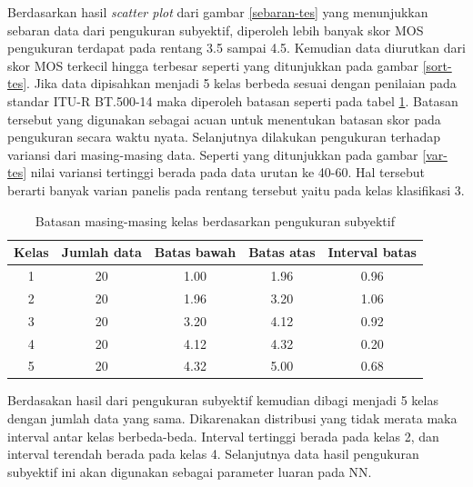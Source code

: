 Berdasarkan hasil \textit{scatter plot} dari gambar \ref{sebaran-tes} yang menunjukkan sebaran data dari pengukuran subyektif, diperoleh lebih banyak skor MOS pengukuran terdapat pada rentang 3.5 sampai 4.5. Kemudian data diurutkan dari skor MOS terkecil hingga terbesar seperti yang ditunjukkan pada gambar \ref{sort-tes}. Jika data dipisahkan menjadi 5 kelas berbeda sesuai dengan penilaian pada standar ITU-R BT.500-14 maka diperoleh batasan seperti pada tabel \ref{batas-kelas}. Batasan tersebut yang digunakan sebagai acuan untuk menentukan batasan skor pada pengukuran secara waktu nyata. Selanjutnya dilakukan pengukuran terhadap variansi dari masing-masing data. Seperti yang ditunjukkan pada gambar \ref{var-tes} nilai variansi tertinggi berada pada data urutan ke 40-60. Hal tersebut berarti banyak varian panelis pada rentang tersebut yaitu pada kelas klasifikasi 3.

\begin{table}[H]
	\fontsize{12pt}{12pt}\selectfont
	\centering
	\caption{Batasan masing-masing kelas berdasarkan pengukuran subyektif}
	\label{batas-kelas}
	\begin{tabular}{|c|c|c|c|c|}
		\hline
		\rowcolor[HTML]{EFEFEF} 
		Kelas & Jumlah data & Batas bawah & Batas atas & \multicolumn{1}{l|}{\cellcolor[HTML]{EFEFEF}Interval batas} \\ \hline
			1 & 20 & 1.00 & 1.96 & 0.96 \\ \hline
			2 & 20 & 1.96 & 3.20 & 1.06 \\ \hline
			3 & 20 & 3.20 & 4.12 & 0.92 \\ \hline
			4 & 20 & 4.12 & 4.32 & 0.20 \\ \hline
			5 & 20 & 4.32 & 5.00 & 0.68 \\ \hline
	\end{tabular}
\end{table}

Berdasakan hasil dari pengukuran subyektif kemudian dibagi menjadi 5 kelas dengan jumlah data yang sama. Dikarenakan distribusi yang tidak merata maka interval antar kelas berbeda-beda. Interval tertinggi berada pada kelas 2, dan interval terendah berada pada kelas 4. Selanjutnya data hasil pengukuran subyektif  ini akan digunakan sebagai parameter luaran pada NN.


